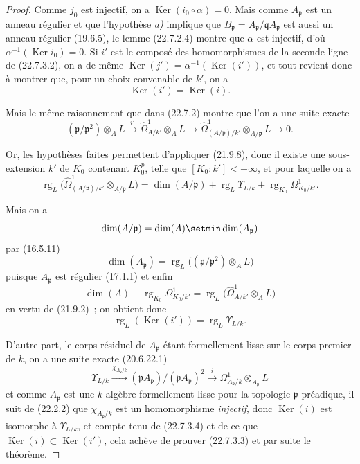 \begin{proof}
Comme $j_0$ est injectif, on a $\operatorname{Ker}(i_0\circ\alpha)=0$. Mais comme
$A_{\mathfrak p}$ est un anneau régulier et que l'hypothèse \emph{a)} implique que
$B_{\mathfrak p}=A_{\mathfrak p}/\mathfrak qA_{\mathfrak p}$ est aussi un
anneau régulier (19.6.5), le lemme (22.7.2.4) montre que $\alpha$ est injectif,
d'où $\alpha^{-1}(\operatorname{Ker} i_0)=0$. Si $i'$ est le composé des homomorphismes de la
seconde ligne de (22.7.3.2), on a de même
$\operatorname{Ker}(j')=\alpha^{-1}(\operatorname{Ker}(i'))$, et tout revient donc à montrer que, pour un
choix convenable de $k'$, on a
\begin{equation}
\label{0.22.7.3.3-fr}
  \operatorname{Ker}(i')=\operatorname{Ker}(i).
  \tag{22.7.3.3}
\end{equation}

Mais le même raisonnement que dans (22.7.2) montre que l'on a une suite exacte
\[
  (\mathfrak p/\mathfrak p^2)\otimes_AL\xrightarrow{i'}
  \widehat\Omega^1_{A/k'}\otimes_AL\longrightarrow
  \widehat\Omega^1_{(A/\mathfrak p)/k'}\otimes_{A/\mathfrak p}L
  \longrightarrow0.
\]

Or, les hypothèses faites permettent d'appliquer (21.9.8), donc il existe une
sous-extension $k'$ de $K_0$ contenant $K_0^p$, telle que
$[K_0:k']<+\infty$, et pour laquelle on a
\[
  \operatorname{rg}_L\bigl(\widehat\Omega^1_{(A/\mathfrak p)/k'}
  \otimes_{A/\mathfrak p}L\bigr)
  =\dim(A/\mathfrak p)+\operatorname{rg}_L\Upsilon_{L/k}
  +\operatorname{rg}_{K_0}\Omega^1_{K_0/k'}.
\]

Mais on a
\[
  \dim(A/\mathfrak p)=\dim(A)\setmin\dim(A_{\mathfrak p})
\]
par (16.5.11)
\[
  \dim(A_{\mathfrak p})
  =\operatorname{rg}_L\bigl((\mathfrak p/\mathfrak p^2)\otimes_AL\bigr)
\]
puisque $A_{\mathfrak p}$ est régulier (17.1.1) et enfin
\[
  \dim(A)+\operatorname{rg}_{K_0}\Omega^1_{K_0/k'}
  =\operatorname{rg}_L\bigl(\widehat\Omega^1_{A/k'}\otimes_AL\bigr)
\]
en vertu de (21.9.2)~; on obtient donc
\begin{equation}
\label{0.22.7.3.4-fr}
  \operatorname{rg}_L(\operatorname{Ker}(i'))=\operatorname{rg}_L\Upsilon_{L/k}.
  \tag{22.7.3.4}
\end{equation}

D'autre part, le corps résiduel de $A_{\mathfrak p}$ étant formellement lisse
sur le corps premier de $k$, on a une suite exacte (20.6.22.1)
\[
  \Upsilon_{L/k}\xrightarrow{\chi_{A_{\mathfrak p}/k}}
  (\mathfrak pA_{\mathfrak p})/(\mathfrak pA_{\mathfrak p})^2
  \xrightarrow{i}\Omega^1_{A_{\mathfrak p}/k}
  \otimes_{A_{\mathfrak p}}L
\]
et comme $A_{\mathfrak p}$ est une $k$-algèbre formellement lisse pour la
topologie $\mathfrak p$-préadique, il suit de (22.2.2) que
$\chi_{A_{\mathfrak p}/k}$ est un homomorphisme \emph{injectif}, donc $\operatorname{Ker}(i)$ est
isomorphe à $\Upsilon_{L/k}$, et compte tenu de (22.7.3.4) et de ce que
$\operatorname{Ker}(i)\subset\operatorname{Ker}(i')$, cela achève de prouver (22.7.3.3) et par suite le
théorème.
\end{proof}


